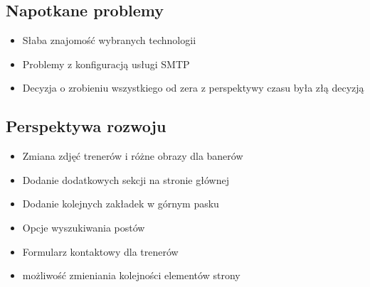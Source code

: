\documentclass[12pt]{article}
\begin{document}
\subsection{Napotkane problemy}
\begin{itemize}
\item Słaba znajomość wybranych technologii
\item Problemy z konfiguracją usługi SMTP
\item Decyzja o zrobieniu wszystkiego od zera z perspektywy czasu była złą decyzją

\end{itemize}
\subsection{Perspektywa rozwoju}
\begin{itemize}
\item Zmiana zdjęć trenerów i różne obrazy dla banerów
\item Dodanie dodatkowych sekcji na stronie głównej
\item Dodanie kolejnych zakładek w górnym pasku
\item Opcje wyszukiwania postów
\item Formularz kontaktowy dla trenerów
\item możliwość zmieniania kolejności elementów strony 
\end{itemize}
\end{document}
